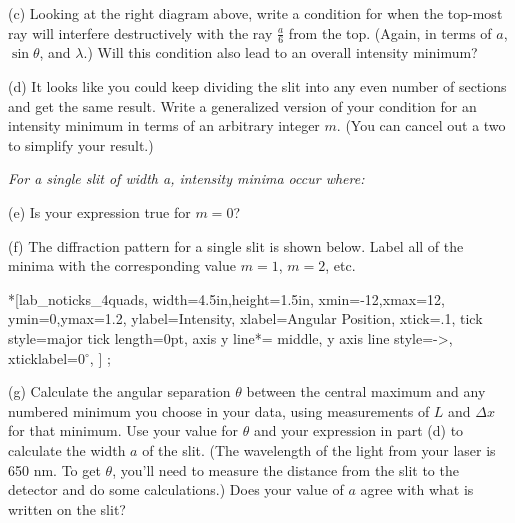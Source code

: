 (c) Looking at the right diagram above, write a condition for when the top-most ray will interfere destructively with the ray $\frac{a}{6}$ from the top.  (Again, in terms of $a$, $\sin \theta$, and $\lambda$.)  Will this condition also lead to an overall intensity minimum?
\answerspace{0.4in}

(d) It looks like you could keep dividing the slit into any even number of sections and get the same result.  Write a generalized version of your condition for an intensity minimum in terms of an arbitrary integer $m$.  (You can cancel out a two to simplify your result.)

\answerspace{0.1in}
\hspace{0.8in}\textit{For a single slit of width \textit{a}, intensity \textit{minima} occur where: }
\answerspace{0.1in}

(e) Is your expression true for $m=0$?
\answerspace{0.4in}

(f) The diffraction pattern for a single slit is shown below.  Label all of the minima with the corresponding value $m=1$, $m=2$, etc.  
\label{fraunhofer_graph}

\begin{lab_axis}*[lab_noticks_4quads,
	width=4.5in,height=1.5in,
	xmin=-12,xmax=12,
	ymin=0,ymax=1.2,
	ylabel=Intensity,
	xlabel=Angular Position,
	xtick={.1}, %
	tick style={major tick length=0pt},
	axis y line*= {middle, y axis line style={->}}, %
	xticklabel={0$^\circ$},
]
;
\end{lab_axis}

\pagebreak[3]

(g) Calculate the angular separation $\theta$ between the central maximum and any numbered minimum you choose in your data, using measurements of $L$ and $\Delta x$ for that minimum.  Use your value for $\theta$ and your expression in part (d) to calculate the width $a$ of the slit.  (The wavelength of the light from your laser is 650 nm.  To get $\theta$, you'll need to measure the distance from the slit to the detector and do some calculations.)    Does your value of $a$ agree with what is written on the slit?
\answerspace{1.0in}


